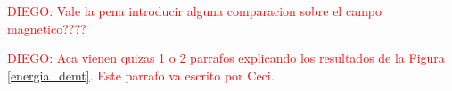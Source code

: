 \documentclass[namedreferences]{solarphysics}
\def\diego#1{\textcolor{red}{DIEGO: #1}}
\begin{document}
\begin{article}
\diego{Vale la pena introducir alguna comparacion sobre el campo magnetico????}

\diego{Aca vienen quizas 1 o 2 parrafos  explicando los resultados de la Figura \ref{energia_demt}. Este parrafo va escrito por Ceci.}


\end{article}
\end{document}
